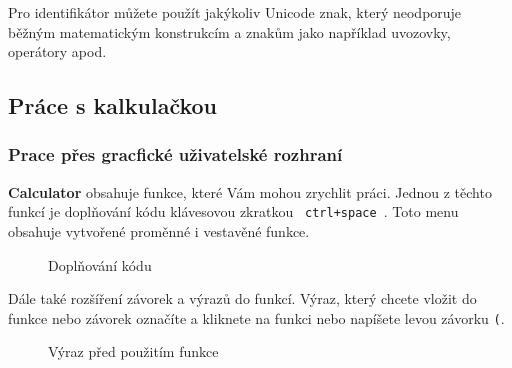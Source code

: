 \documentclass[a4paper, 11pt]{article}
\begin{document}
Pro identifikátor můžete použít jakýkoliv Unicode znak, který neodporuje
běžným matematickým konstrukcím a znakům jako například uvozovky, operátory apod.

\subsection{Práce s kalkulačkou}

\subsubsection {Prace přes gracfické uživatelské rozhraní}

\textbf{Calculator} obsahuje funkce, které Vám mohou zrychlit práci.
Jednou z těchto funkcí je doplňování kódu klávesovou zkratkou
\texttt{ ctrl+space }. Toto menu obsahuje vytvořené proměnné i vestavěné funkce.

\begin{figure}[H]
    \centering
    \caption{Doplňování kódu}
\end{figure}

Dále také rozšíření závorek a výrazů do funkcí. Výraz, který chcete
vložit do funkce nebo závorek označíte a kliknete na funkci nebo
napíšete levou závorku \texttt{(}.

\begin{figure}[H]
    \centering
    \caption{Výraz před použitím funkce}
\end{figure}
\end{document}

